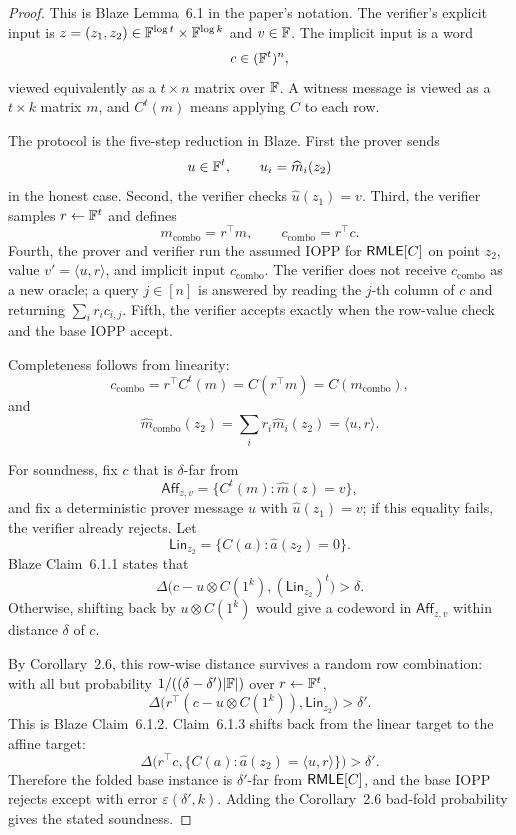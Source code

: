 \begin{proof}
This is Blaze Lemma~6.1 in the paper's notation.  The verifier's explicit
input is \(z=(z_1,z_2)\in\mathbb{F}^{\log t}\times\mathbb{F}^{\log k}\) and \(v\in\mathbb{F}\).  The
implicit input is a word
\[
  c\in(\mathbb{F}^t)^n,
\]
viewed equivalently as a \(t\times n\) matrix over \(\mathbb{F}\).  A witness message is
viewed as a \(t\times k\) matrix \(m\), and \(C^t(m)\) means applying \(C\) to
each row.

The protocol is the five-step reduction in Blaze.  First the prover sends
\[
  u\in\mathbb{F}^t,
  \qquad
  u_i=\widehat m_i(z_2)
\]
in the honest case.  Second, the verifier checks \(\widehat u(z_1)=v\).  Third,
the verifier samples \(r\leftarrow\mathbb{F}^t\) and defines
\[
  m_{\mathrm{combo}}=r^\top m,
  \qquad
  c_{\mathrm{combo}}=r^\top c.
\]
Fourth, the prover and verifier run the assumed IOPP for \(\mathsf{RMLE}[C]\) on point
\(z_2\), value \(v'=\langle u,r\rangle\), and implicit input
\(c_{\mathrm{combo}}\).  The verifier does not receive
\(c_{\mathrm{combo}}\) as a new oracle; a query \(j\in[n]\) is answered by
reading the \(j\)-th column of \(c\) and returning
\(\sum_i r_i c_{i,j}\).  Fifth, the verifier accepts exactly when the row-value
check and the base IOPP accept.

Completeness follows from linearity:
\[
  c_{\mathrm{combo}}
  =
  r^\top C^t(m)
  =
  C(r^\top m)
  =
  C(m_{\mathrm{combo}}),
\]
and
\[
  \widehat m_{\mathrm{combo}}(z_2)
  =
  \sum_i r_i\widehat m_i(z_2)
  =
  \langle u,r\rangle.
\]

For soundness, fix \(c\) that is \(\delta\)-far from
\[
  \mathsf{Aff}_{z,v}
  =
  \{C^t(m):\widehat m(z)=v\},
\]
and fix a deterministic prover message \(u\) with \(\widehat u(z_1)=v\); if
this equality fails, the verifier already rejects.  Let
\[
  \mathsf{Lin}_{z_2}
  =
  \{C(a):\widehat a(z_2)=0\}.
\]
Blaze Claim~6.1.1 states that
\[
  \Delta\bigl(c-u\otimes C(1^k),(\mathsf{Lin}_{z_2})^t\bigr)>\delta.
\]
Otherwise, shifting back by \(u\otimes C(1^k)\) would give a codeword in
\(\mathsf{Aff}_{z,v}\) within distance \(\delta\) of \(c\).

By Corollary~2.6, this row-wise distance survives a random row combination:
with all but probability \(1/((\delta-\delta')|\mathbb{F}|)\) over
\(r\leftarrow\mathbb{F}^t\),
\[
  \Delta\bigl(r^\top(c-u\otimes C(1^k)),\mathsf{Lin}_{z_2}\bigr)>\delta'.
\]
This is Blaze Claim~6.1.2.  Claim~6.1.3 shifts back from the linear target to
the affine target:
\[
  \Delta\bigl(r^\top c,\{C(a):\widehat a(z_2)=\langle u,r\rangle\}\bigr)
  >
  \delta'.
\]
Therefore the folded base instance is \(\delta'\)-far from
\(\mathsf{RMLE}[C]\), and the base IOPP rejects except with error
\(\varepsilon(\delta',k)\).  Adding the Corollary~2.6 bad-fold probability
gives the stated soundness.
\end{proof}

